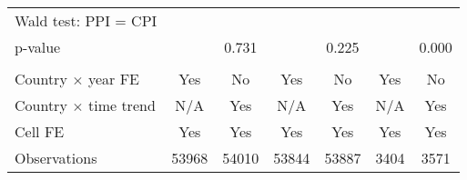{\begin{tabular}{l*{6}{c}}
Wald test: PPI = CPI&                     &                     &                     &                     &                     &                     \\
\hspace{15pt} p-value&                     &       0.731         &                     &       0.225         &                     &       0.000         \\
\hline \\ Country $\times$ year FE&         Yes         &          No         &         Yes         &          No         &         Yes         &          No         \\
Country $\times$ time trend&         N/A         &         Yes         &         N/A         &         Yes         &         N/A         &         Yes         \\
Cell FE             &         Yes         &         Yes         &         Yes         &         Yes         &         Yes         &         Yes         \\
Observations        &       53968         &       54010         &       53844         &       53887         &        3404         &        3571         \\
\hline\hline
\end{tabular}
}
